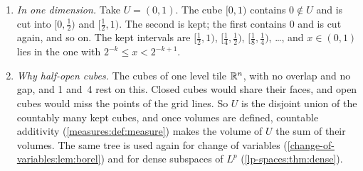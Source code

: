 \begin{notechapter}
\begin{remark}
\begin{enumerate}[nosep]
        and it need not be: it is not in the open disc.
  \item \emph{In one dimension.} Take $U = (0, 1)$. The cube $[0, 1)$
        contains $0\notin U$ and is cut into $[0, \frac12)$ and
        $[\frac12, 1)$. The second is kept; the first contains $0$ and
        is cut again, and so on. The kept intervals are
        $[\frac12, 1)$, $[\frac14, \frac12)$, $[\frac18, \frac14)$,
        \dots, and $x\in(0, 1)$ lies in the one with
        $2^{-k}\leq x < 2^{-k+1}$.
  \item \emph{Why half-open cubes.} The cubes of one level tile $\mathbb{R}^n$,
        with no overlap and no gap, and 1 and~4 rest on this. Closed
        cubes would share their faces, and open cubes would miss the
        points of the grid lines. So $U$ is the disjoint union of the
        countably many kept cubes, and once volumes are defined,
        countable additivity (\cref{measures:def:measure}) makes the
        volume of $U$ the sum of their volumes. The same tree is used
        again for change of variables
        (\cref{change-of-variables:lem:borel}) and for dense subspaces
        of $L^p$ (\cref{lp-spaces:thm:dense}).
\end{enumerate}
\end{remark}


\end{notechapter}
